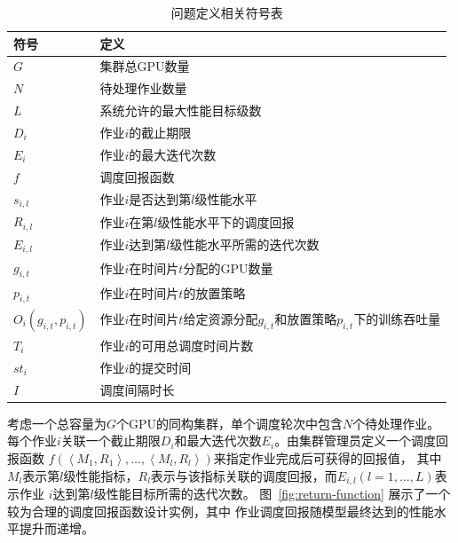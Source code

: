 \begin{table}
  \centering
  \caption{问题定义相关符号表}
  \begin{tabular}{ll}
    \toprule
    符号                      & 定义                                               \\
    \midrule
    $G$                     & 集群总GPU数量                                         \\
    $N$                     & 待处理作业数量                                          \\
    $L$                     & 系统允许的最大性能目标级数                                          \\
    $D_i$                   & 作业$i$的截止期限                                       \\
    $E_i$                   & 作业$i$的最大迭代次数                                     \\
    $f$                     & 调度回报函数                                             \\
    $s_{i,l}$               & 作业$i$是否达到第$l$级性能水平                               \\
    $R_{i,l}$               & 作业$i$在第$l$级性能水平下的调度回报                            \\
    $E_{i,l}$               & 作业$i$达到第$l$级性能水平所需的迭代次数                           \\
    $g_{i,t}$               & 作业$i$在时间片$t$分配的GPU数量                             \\
    $p_{i,t}$               & 作业$i$在时间片$t$的放置策略                                \\
    $O_i\left(g_{i,t}, p_{i,t}\right)$ & 作业$i$在时间片$t$给定资源分配$g_{i,t}$和放置策略$p_{i,t}$下的训练吞吐量 \\
    $T_i$                   & 作业$i$的可用总调度时间片数                                  \\
    $st_i$                  & 作业$i$的提交时间                                       \\
    $I$                     & 调度间隔时长                                           \\
    \bottomrule
  \end{tabular}
  \label{tab:chapter3-1}
\end{table}

考虑一个总容量为$G$个GPU的同构集群，单个调度轮次中包含$N$个待处理作业。
每个作业$i$关联一个截止期限$D_i$和最大迭代次数$E_i$。由集群管理员定义一个调度回报函数
$f\left(\left\langle M_1, R_1 \right\rangle, \ldots, \left\langle M_l, R_l \right\rangle\right)$来指定作业完成后可获得的回报值，
其中$M_l$表示第$l$级性能指标，$R_l$表示与该指标关联的调度回报，而$E_{i,l} \left(l = 1, \ldots, L\right)$表示作业
$i$达到第$l$级性能目标所需的迭代次数。
图~\ref{fig:return-function} 展示了一个较为合理的调度回报函数设计实例，其中
作业调度回报随模型最终达到的性能水平提升而递增。

